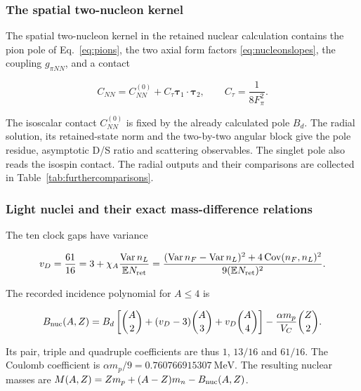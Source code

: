 \documentclass[aps,prx,onecolumn,10pt,notitlepage,nofootinbib,longbibliography]{revtex4-2}
\numberwithin{equation}{section}
\numberwithin{table}{section}
\newcommand{\EE}{\mathbb E}
\begin{document}
\subsubsection{The spatial two-nucleon kernel}\label{the-spatial-two-nucleon-kernel}

The spatial two-nucleon kernel in the retained nuclear calculation contains the pion pole of Eq.~\eqref{eq:pions}, the two axial form factors \eqref{eq:nucleonslopes}, the coupling \(g_{\pi NN}\), and a contact

\begin{equation}
C_{NN}=C_{NN}^{(0)}+C_\tau\boldsymbol\tau_1\cdot\boldsymbol\tau_2,
\qquad C_\tau=\frac1{8F_\pi^2}.
\label{eq:attempt-S10-5}
\end{equation}

The isoscalar contact \(C_{NN}^{(0)}\) is fixed by the already calculated pole \(B_d\).
The radial solution, its retained-state norm and the two-by-two angular block
give the pole residue, asymptotic D/S ratio and scattering observables.
The singlet pole also reads the isospin contact. The radial
outputs and their comparisons are collected in Table~\ref{tab:furthercomparisons}.

\subsubsection{Light nuclei and their exact mass-difference relations}\label{light-nuclei-and-their-exact-mass-difference-relations}

The ten clock gaps have variance

\begin{equation}
v_D=\frac{61}{16}=3+\chi_A\frac{\operatorname{Var}n_L}{\EE N_{\rm ret}}
=\frac{(\operatorname{Var}n_F-\operatorname{Var}n_L)^2+4\operatorname{Cov}(n_F,n_L)^2}{9(\EE N_{\rm ret})^2}.
\end{equation}

The recorded incidence polynomial for \(A\le4\) is

\begin{equation}
B_{\rm nuc}(A,Z)=B_d\left[\binom A2+(v_D-3)\binom A3+v_D\binom A4\right]
-\frac{\alpha m_p}{V_C}\binom Z2.
\label{eq:attempt-S11-1}
\end{equation}

Its pair, triple and quadruple coefficients are thus \(1\), \(13/16\) and \(61/16\). The Coulomb coefficient is \(\alpha m_p/9=0.760766915307\ \mathrm{MeV}\). The resulting nuclear masses are \(M(A,Z)=Zm_p+(A-Z)m_n-B_{\rm nuc}(A,Z)\).
\end{document}
